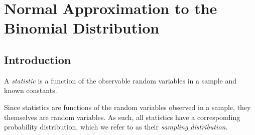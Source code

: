 \setcounter{chapter}{3} %
\chapter{Normal Approximation to the Binomial Distribution}

\section{Introduction}

\begin{definition}[Statistic]
A \textit{statistic} is a function of the observable random variables in a sample and known constants.

Since statistics are functions of the random variables observed in a sample, they themselves are random variables. As such, all statistics have a corresponding probability distribution, which we refer to as their \textit{sampling distribution}.
\end{definition}
